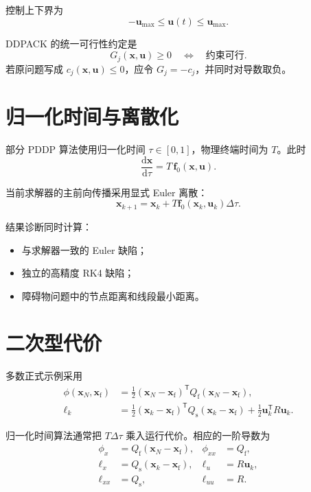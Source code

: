 \documentclass[UTF8,zihao=-4,openany,fontset=fandol]{ctexbook}
\begin{document}
控制上下界为
\begin{equation}
  -\bm{u}_{\max}\le \bm{u}(t)\le \bm{u}_{\max}.
\end{equation}

DDPACK 的统一可行性约定是
\begin{equation}
  G_j(\bm{x},\bm{u})\ge 0
  \quad\Longleftrightarrow\quad
  \text{约束可行}.
\end{equation}
若原问题写成 $c_j(\bm{x},\bm{u})\le 0$，应令
$G_j=-c_j$，并同时对导数取负。

\section{归一化时间与离散化}

部分 PDDP 算法使用归一化时间 $\tau\in[0,1]$，物理终端时间为 $T$。此时
\begin{equation}
  \frac{\mathrm d\bm{x}}{\mathrm d\tau}
  =T\,\bm{f}_0(\bm{x},\bm{u}).
\end{equation}

当前求解器的主前向传播采用显式 Euler 离散：
\begin{equation}
  \bm{x}_{k+1}
  =
  \bm{x}_k
  +T\bm{f}_0(\bm{x}_k,\bm{u}_k)\Delta\tau .
  \label{eq:euler}
\end{equation}

结果诊断同时计算：

\begin{itemize}[leftmargin=2em]
  \item 与求解器一致的 Euler 缺陷；
  \item 独立的高精度 RK4 缺陷；
  \item 障碍物问题中的节点距离和线段最小距离。
\end{itemize}

\section{二次型代价}

多数正式示例采用
\begin{align}
  \phi(\bm{x}_N,\bm{x}_{\mathrm f})
  &=
  \frac{1}{2}
  (\bm{x}_N-\bm{x}_{\mathrm f})^\mathsf{T}
  Q_{\mathrm f}
  (\bm{x}_N-\bm{x}_{\mathrm f}),\\
  \ell_k
  &=
  \frac{1}{2}
  (\bm{x}_k-\bm{x}_{\mathrm f})^\mathsf{T}
  Q_{\mathrm s}
  (\bm{x}_k-\bm{x}_{\mathrm f})
  +
  \frac{1}{2}\bm{u}_k^\mathsf{T}R\bm{u}_k .
\end{align}

归一化时间算法通常把 $T\Delta\tau$ 乘入运行代价。相应的一阶导数为
\begin{align}
  \phi_x &= Q_{\mathrm f}(\bm{x}_N-\bm{x}_{\mathrm f}),&
  \phi_{xx} &= Q_{\mathrm f},\\
  \ell_x &= Q_{\mathrm s}(\bm{x}_k-\bm{x}_{\mathrm f}),&
  \ell_u &= R\bm{u}_k,\\
  \ell_{xx} &= Q_{\mathrm s},&
  \ell_{uu} &= R.
\end{align}
\end{document}
